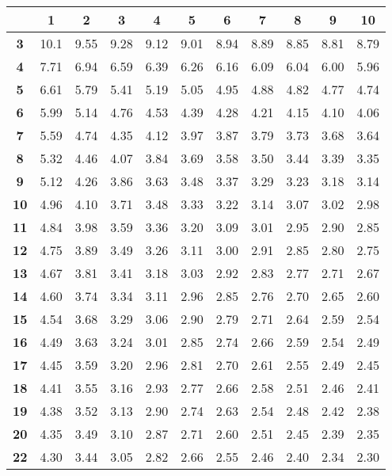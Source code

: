 \noindent\begin{tabular}{*{11}{|c}|}
    \hline
     & \textbf1 & \textbf2 & \textbf3 & \textbf4 & \textbf5 & \textbf6 & \textbf7 & \textbf8 & \textbf9 & \textbf10 \\ 
 \hline 
 \textbf{3} & 10.1 &9.55 &9.28 &9.12 &9.01 &8.94 &8.89 &8.85 &8.81 &8.79 \\
\hline 
\textbf{4} & 7.71 &6.94 &6.59 &6.39 &6.26 &6.16 &6.09 &6.04 &6.00 &5.96 \\
\hline 
\textbf{5} & 6.61 &5.79 &5.41 &5.19 &5.05 &4.95 &4.88 &4.82 &4.77 &4.74 \\
\hline 
\textbf{6} & 5.99 &5.14 &4.76 &4.53 &4.39 &4.28 &4.21 &4.15 &4.10 &4.06 \\
\hline 
\textbf{7} & 5.59 &4.74 &4.35 &4.12 &3.97 &3.87 &3.79 &3.73 &3.68 &3.64 \\
\hline 
\textbf{8} & 5.32 &4.46 &4.07 &3.84 &3.69 &3.58 &3.50 &3.44 &3.39 &3.35 \\
\hline 
\textbf{9} & 5.12 &4.26 &3.86 &3.63 &3.48 &3.37 &3.29 &3.23 &3.18 &3.14 \\
\hline 
\textbf{10} & 4.96 &4.10 &3.71 &3.48 &3.33 &3.22 &3.14 &3.07 &3.02 &2.98 \\
\hline 
\textbf{11} & 4.84 &3.98 &3.59 &3.36 &3.20 &3.09 &3.01 &2.95 &2.90 &2.85 \\
\hline 
\textbf{12} & 4.75 &3.89 &3.49 &3.26 &3.11 &3.00 &2.91 &2.85 &2.80 &2.75 \\
\hline 
\textbf{13} & 4.67 &3.81 &3.41 &3.18 &3.03 &2.92 &2.83 &2.77 &2.71 &2.67 \\
\hline 
\textbf{14} & 4.60 &3.74 &3.34 &3.11 &2.96 &2.85 &2.76 &2.70 &2.65 &2.60 \\
\hline 
\textbf{15} & 4.54 &3.68 &3.29 &3.06 &2.90 &2.79 &2.71 &2.64 &2.59 &2.54 \\
\hline 
\textbf{16} & 4.49 &3.63 &3.24 &3.01 &2.85 &2.74 &2.66 &2.59 &2.54 &2.49 \\
\hline 
\textbf{17} & 4.45 &3.59 &3.20 &2.96 &2.81 &2.70 &2.61 &2.55 &2.49 &2.45 \\
\hline 
\textbf{18} & 4.41 &3.55 &3.16 &2.93 &2.77 &2.66 &2.58 &2.51 &2.46 &2.41 \\
\hline 
\textbf{19} & 4.38 &3.52 &3.13 &2.90 &2.74 &2.63 &2.54 &2.48 &2.42 &2.38 \\
\hline 
\textbf{20} & 4.35 &3.49 &3.10 &2.87 &2.71 &2.60 &2.51 &2.45 &2.39 &2.35 \\
\hline 
\textbf{22} & 4.30 &3.44 &3.05 &2.82 &2.66 &2.55 &2.46 &2.40 &2.34 &2.30 \\

\end{tabular}
